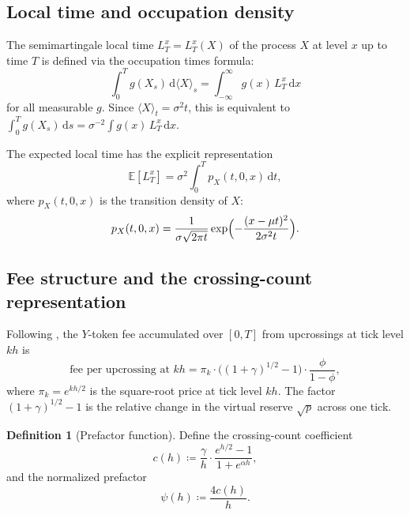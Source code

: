 \documentclass[11pt]{article}
\theoremstyle{definition}
\newtheorem{definition}[theorem]{Definition}
\theoremstyle{remark}
\newcommand{\E}{\mathbb{E}}
\newcommand{\dd}{\,\mathrm{d}}
\begin{document}
\subsection{Local time and occupation density}

The semimartingale local time $L^x_T = L^x_T(X)$ of the process $X$
at level $x$ up to time $T$ is defined via the occupation times
formula:
\begin{equation}\label{eq:occupation}
\int_0^T g(X_s)\dd\langle X\rangle_s
= \int_{-\infty}^{\infty} g(x)\,L^x_T\dd x
\end{equation}
for all measurable $g$. Since $\langle X\rangle_t = \sigma^2 t$, this
is equivalent to
$\int_0^T g(X_s)\dd s
= \sigma^{-2}\int g(x)\,L^x_T\dd x$.

The expected local time has the explicit representation
\begin{equation}\label{eq:expected_LT}
\E[L^x_T] = \sigma^2 \int_0^T p_X(t, 0, x)\dd t,
\end{equation}
where $p_X(t, 0, x)$ is the transition density of $X$:
\begin{equation}\label{eq:transition}
p_X(t, 0, x) = \frac{1}{\sigma\sqrt{2\pi t}}
\exp\Bigl(-\frac{(x - \mu t)^2}{2\sigma^2 t}\Bigr).
\end{equation}

\subsection{Fee structure and the crossing-count representation}

Following \citet{EGM2025}, the $Y$-token fee accumulated over
$[0, T]$ from upcrossings at tick level $kh$ is
\begin{equation}\label{eq:fee_per_cross}
\text{fee per upcrossing at } kh
= \pi_k \cdot \bigl((1{+}\gamma)^{1/2} - 1\bigr)
\cdot \frac{\phi}{1 - \phi},
\end{equation}
where $\pi_k = e^{kh/2}$ is the square-root price at tick level $kh$.
The factor $(1+\gamma)^{1/2} - 1$ is the relative change in the
virtual reserve $\sqrt{p}$ across one tick.

\begin{definition}[Prefactor function]\label{def:prefactor}
Define the crossing-count coefficient
\begin{equation}\label{eq:c_def}
c(h) \coloneqq \frac{\gamma}{h} \cdot
\frac{e^{h/2} - 1}{1 + e^{\alpha h}},
\end{equation}
and the normalized prefactor
\begin{equation}\label{eq:psi_def}
\psi(h) \coloneqq \frac{4c(h)}{h}.
\end{equation}
\end{definition}
\end{document}
